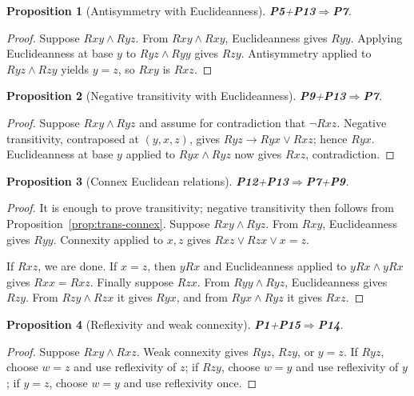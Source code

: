 \documentclass[11pt,a4paper,reqno]{amsart}
\newtheorem{proposition}{Proposition}[section]
\theoremstyle{definition}
\theoremstyle{remark}
\newcommand{\prop}[1]{\textbf{P#1}}
\newcommand{\catentails}{\Rightarrow}
\begin{document}
\begin{proposition}[Antisymmetry with Euclideanness]\label{prop:p5p13}
\prop{5}+\prop{13}$\catentails$\prop{7}.
\end{proposition}
\begin{proof}
Suppose $Rxy\wedge Ryz$.  From $Rxy\wedge Rxy$, Euclideanness gives
$Ryy$.  Applying Euclideanness at base $y$ to $Ryz\wedge Ryy$ gives
$Rzy$.  Antisymmetry applied to $Ryz\wedge Rzy$ yields $y=z$, so $Rxy$ is
$Rxz$.
\end{proof}

\begin{proposition}[Negative transitivity with Euclideanness]\label{prop:p9p13}
\prop{9}+\prop{13}$\catentails$\prop{7}.
\end{proposition}
\begin{proof}
Suppose $Rxy\wedge Ryz$ and assume for contradiction that $\neg Rxz$.
Negative transitivity, contraposed at $(y,x,z)$, gives
$Ryz\to Ryx\vee Rxz$; hence $Ryx$.  Euclideanness at base $y$ applied to
$Ryx\wedge Ryz$ now gives $Rxz$, contradiction.
\end{proof}

\begin{proposition}[Connex Euclidean relations]\label{prop:p12p13}
\prop{12}+\prop{13}$\catentails$\prop{7}+\prop{9}.
\end{proposition}
\begin{proof}
It is enough to prove transitivity; negative transitivity then follows from
Proposition~\ref{prop:trans-connex}.  Suppose $Rxy\wedge Ryz$.  From $Rxy$,
Euclideanness gives $Ryy$.  Connexity applied to $x,z$ gives
$Rxz\vee Rzx\vee x=z$.

If $Rxz$, we are done.  If $x=z$, then $yRx$ and Euclideanness applied to
$yRx\wedge yRx$ gives $Rxx=Rxz$.  Finally suppose $Rzx$.  From
$Ryy\wedge Ryz$, Euclideanness gives $Rzy$.  From $Rzy\wedge Rzx$ it gives
$Ryx$, and from $Ryx\wedge Ryz$ it gives $Rxz$.
\end{proof}

\begin{proposition}[Reflexivity and weak connexity]\label{prop:p1p15}
\prop{1}+\prop{15}$\catentails$\prop{14}.
\end{proposition}
\begin{proof}
Suppose $Rxy\wedge Rxz$.  Weak connexity gives $Ryz$, $Rzy$, or $y=z$.
If $Ryz$, choose $w=z$ and use reflexivity of $z$; if $Rzy$, choose $w=y$ and
use reflexivity of $y$; if $y=z$, choose $w=y$ and use reflexivity once.
\end{proof}
\end{document}
